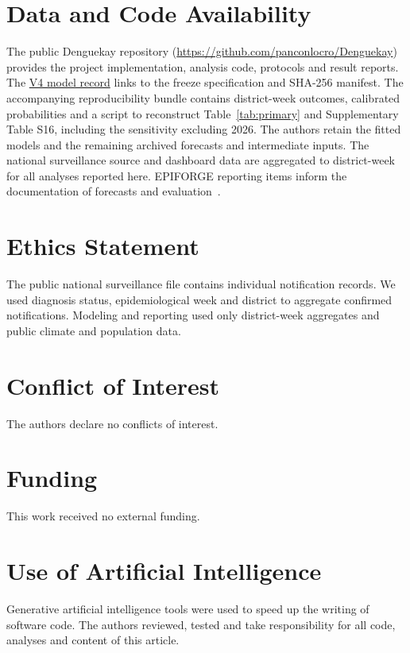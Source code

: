 \documentclass[journal]{IEEEtran}
\begin{document}
\section*{Data and Code Availability}
The public Denguekay repository (\url{https://github.com/panconlocro/Denguekay}) provides the project implementation, analysis code, protocols and result reports. The \href{https://github.com/panconlocro/Denguekay/blob/36e2cc62826aada83e727a2d650ef04422e9ebf3/models/registry/v4/ficha.md}{V4 model record} links to the freeze specification and SHA-256 manifest. The accompanying reproducibility bundle contains district-week outcomes, calibrated probabilities and a script to reconstruct Table~\ref{tab:primary} and Supplementary Table S16, including the sensitivity excluding 2026. The authors retain the fitted models and the remaining archived forecasts and intermediate inputs. The national surveillance source and dashboard data are aggregated to district-week for all analyses reported here. EPIFORGE reporting items inform the documentation of forecasts and evaluation~\cite{pollett2021}.

\section*{Ethics Statement}
The public national surveillance file contains individual notification records. We used diagnosis status, epidemiological week and district to aggregate confirmed notifications. Modeling and reporting used only district-week aggregates and public climate and population data.

\section*{Conflict of Interest}
The authors declare no conflicts of interest.

\section*{Funding}
This work received no external funding.

\section*{Use of Artificial Intelligence}
Generative artificial intelligence tools were used to speed up the writing of software code. The authors reviewed, tested and take responsibility for all code, analyses and content of this article.



\end{document}
